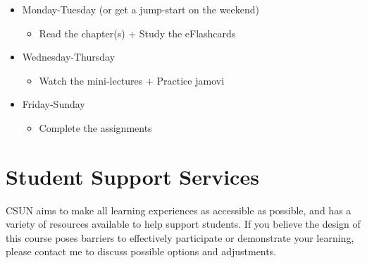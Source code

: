 \documentclass[11pt,]{article}
\providecommand{\tightlist}{%
  \setlength{\itemsep}{0pt}\setlength{\parskip}{0pt}}
\begin{document}
\begin{itemize}
\tightlist
\item
  Monday-Tuesday (or get a jump-start on the weekend)

  \begin{itemize}
  \tightlist
  \item
    Read the chapter(s) + Study the eFlashcards
  \end{itemize}
\item
  Wednesday-Thursday

  \begin{itemize}
  \tightlist
  \item
    Watch the mini-lectures + Practice jamovi
  \end{itemize}
\item
  Friday-Sunday

  \begin{itemize}
  \tightlist
  \item
    Complete the assignments
  \end{itemize}
\end{itemize}

\hypertarget{student-support-services}{%
\section{Student Support Services}\label{student-support-services}}

CSUN aims to make all learning experiences as accessible as possible,
and has a variety of resources available to help support students. If
you believe the design of this course poses barriers to effectively
participate or demonstrate your learning, please contact me to discuss
possible options and adjustments.
\end{document}

